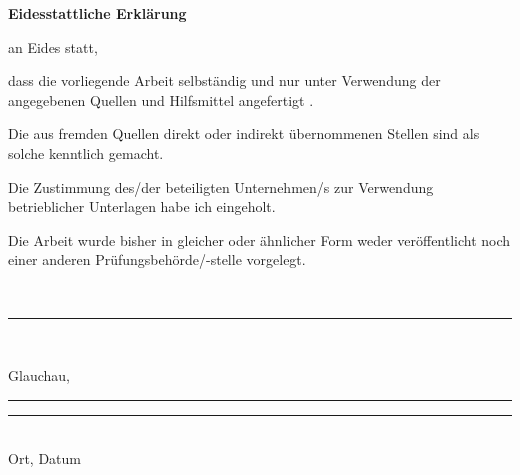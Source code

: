 \cleardoublepage
{}
\rohead{}
    \vspace*{1cm}
    \begin{center}
        \huge\textbf{Eidesstattliche Erklärung}\\
    \end{center}
    \vspace*{1cm}
    \normalsize
     an Eides statt,

    dass  die vorliegende Arbeit selbständig und nur unter Verwendung der angegebenen Quellen und Hilfsmittel angefertigt .

    Die aus fremden Quellen direkt oder indirekt übernommenen Stellen sind als solche kenntlich gemacht.

    Die Zustimmung des/der beteiligten Unternehmen/s zur Verwendung betrieblicher Unterlagen habe ich eingeholt.

    Die Arbeit wurde bisher in gleicher oder ähnlicher Form weder veröffentlicht noch einer anderen Prüfungsbehörde/-stelle vorgelegt.

    \vspace{2cm}
    \autoreins\ifthenelse{\isundefined{\autorzwei}}{}{, \autorzwei\ifthenelse{\isundefined{\autordrei}}{}{, \autordrei\ifthenelse{\isundefined{\autorvier}}{}{, \autorvier}}}\\
    \noindent\rule{0.35\columnwidth}{0.4pt}\\
    \vspace{2cm}
    
    Glauchau, \abgabedatum\newline\noindent\rule{0.35\columnwidth}{0.4pt}\hspace{0.05\columnwidth}\rule{0.6\columnwidth}{0.4pt}\\
    Ort, Datum\hspace{0.27\columnwidth}

\newpage


